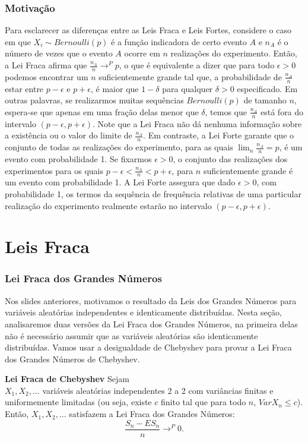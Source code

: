 \begin{frame}
\frametitle{\textbf{Motivação}}
\baselineskip=13pt
\begin{block}{}


Para esclarecer as diferenças entre as Leis Fraca e Leis Fortes, considere o caso em que $X_i\sim Bernoulli(p)$ é a função indicadora de certo evento $A$ e $n_A$ é o número de vezes que o evento $A$ ocorre em $n$ realizações do experimento. Então, a Lei Fraca afirma que $\frac{n_A}{n}\rightarrow^P p$, o que é equivalente a dizer que para todo $\epsilon>0$ podemos encontrar um $n$ suficientemente grande tal que, a probabilidade de $\frac{n_A}{n}$ estar entre $p-\epsilon$ e $p+\epsilon$, é maior que $1-\delta$ para qualquer $\delta>0$ especificado. Em outras palavras, se realizarmos muitas sequências $Bernoulli(p)$ de tamanho $n$, espera-se que apenas em uma fração delas menor que $\delta$, temos que $\frac{n_A}{n}$ está fora do intervalo $(p-\epsilon,p+\epsilon)$. Note que a Lei Fraca não dá nenhuma informação sobre a existência ou o valor do limite de $\frac{n_A}{n}$. Em contraste, a Lei Forte garante que o conjunto de todas as realizações do experimento, para as quais $\lim_n \frac{n_A}{n}=p$, é um evento com probabilidade 1. Se fixarmos $\epsilon>0$, o conjunto das realizações dos experimentos para os quais $p-\epsilon<\frac{n_A}{n}<p+\epsilon$, para $n$ suficientemente grande é um evento com probabilidade 1. A Lei Forte assegura que dado $\epsilon>0$, com probabilidade 1, os termos da sequência de frequência relativas de uma particular realização do experimento realmente estarão no intervalo $(p-\epsilon,p+\epsilon)$.

\end{block}
\end{frame}


\section{Leis Fraca}
\begin{frame}
\frametitle{\textbf{Lei Fraca dos Grandes Números}}
\baselineskip=13pt
\begin{block}{}

Nos slides anteriores, motivamos o resultado da Leis dos Grandes Números
para variáveis aleatórias independentes e identicamente
distribuídas. Nesta seção, analisaremos duas versões da Lei Fraca
dos Grandes Números, na primeira delas não é necessário assumir que
as variáveis aleatórias são identicamente distribuídas.  Vamos usar a
desigualdade de Chebyshev para provar a Lei Fraca dos Grandes Números de
Chebyshev.

\end{block}
\begin{teo}
	{\bf Lei Fraca de Chebyshev} Sejam \\$X_1,X_2,\ldots$ variáveis
	aleatórias independentes 2 a 2 com variâncias finitas e
	uniformemente limitadas (ou seja, existe $c$ finito tal que para
	todo $n$, $Var X_n\leq c$). Então, $X_1,X_2,\ldots$ satisfazem a Lei
	Fraca dos Grandes Números:
	$$\frac{S_n-ES_n}{n}\rightarrow^P 0.$$
\end{teo}
\end{frame}


